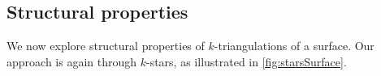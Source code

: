 \documentclass{amsart}
\newtheorem{proposition}[theorem]{Proposition}
\newtheorem{definition}[theorem]{Definition}
\theoremstyle{remark}
\newtheorem{example}[theorem]{Example}
\newcommand{\darkblue}{\color{darkblue}} %
\newcommand{\defn}[1]{\textsl{\darkblue #1}} %
\newcommand{\eqdef}{\mbox{\,\raisebox{0.2ex}{\scriptsize\ensuremath{\mathrm:}}\ensuremath{=}\,}} %
\newcommand*{\ef}[0]{E-finite\xspace}
\newcommand{\surface}{\mathcal{S}}
\newcommand{\vincent}[1]{\todo[color=blue!30]{#1 \\ \hfill --- V.}}
\begin{document}
%
%
%
%
%
%
%



\newpage
\subsection{Structural properties}

We now explore structural properties of $k$-triangulations of a surface.
Our approach is again through $k$-stars, as illustrated in \cref{fig:starsSurface}.


\end{document}
